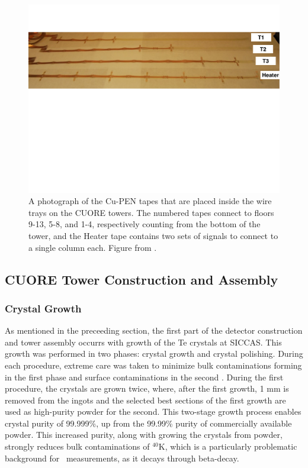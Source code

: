 \begin{figure}
    \centering
    \includegraphics[width=0.9\linewidth]{Figures/fig07.pdf}
    \caption[A photograph of the Cu-PEN tapes that are placed inside the wire trays on the CUORE towers]
    {A photograph of the Cu-PEN tapes that are placed inside the wire trays on the CUORE towers.
    The numbered tapes connect to floors 9-13, 5-8, and 1-4, respectively counting from the bottom of the tower, and the Heater tape contains two sets of signals to connect to a single column each.
    Figure from \cite{Alduino:2016vtd}.}
    \label{fig:CuPEN}
\end{figure}

\subsection{CUORE Tower Construction and Assembly}

\subsubsection{Crystal Growth}
As mentioned in the preceeding section, the first part of the detector construction and tower assembly occurrs with growth of the Te crystals at SICCAS.
This growth was performed in two phases: crystal growth and crystal polishing.
During each procedure, extreme care was taken to minimize bulk contaminations forming in the first phase and surface contaminations in the second \cite{crystal_growth_methods, crystal_growth_methods_2, Barghouty:2010kj}.
During the first procedure, the crystals are grown twice, where, after the first growth, 1 mm is removed from the ingots and the selected best sections of the first growth are used as high-purity powder for the second.
This two-stage growth process enables crystal purity of 99.999\%, up from the 99.99\% purity of commercially available powder.
This increased purity, along with growing the crystals from powder, strongly reduces bulk contaminations of $^{40}$K, which is a particularly problematic background for \twonubb~measurements, as it decays through beta-decay.

